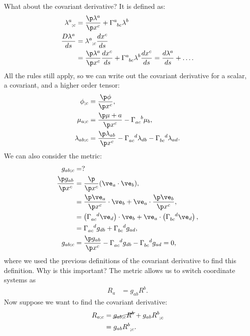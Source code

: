 \documentclass[a4paper, 11pt, normalem]{report}
\begin{document}
What about the covariant derivative?
It is defined as:
\begin{align}
    \tensor{\lambda}{^a_{;c}} &= \frac{\p\lambda^a}{\p x^c} + \tensor{\Gamma}{^a_{bc}}\lambda^b \\
    \frac{D\lambda^a}{ds} &= \tensor{\lambda}{^a_{;c}}\frac{dx^c}{ds} \\
                          &= \frac{\p\lambda^a}{\p x^c}\frac{dx^c}{ds} + \tensor{\Gamma}{^a_{bc}}\lambda^b\frac{dx^c}{ds} = \frac{d\lambda^a}{ds} + \dots.
\end{align}
All the rules still apply, so we can write out the covariant derivative for a scalar, a covariant, and a higher order tensor:
\begin{align}
    \phi_{;c} &= \frac{\p\phi}{\p x^c}, \\
    \mu_{a;c} &= \frac{\p\mu+a}{\p x^c}-\tensor{\Gamma}{_{ac}^b}\mu_b, \\
    \lambda_{ab;c} &= \frac{\p\lambda_{ab}}{\p x^c} - \tensor{\Gamma}{_{ac}^d}\lambda_{db}-\tensor{\Gamma}{_{bc}^d}\lambda_{ad}.
\end{align}
We can also consider the metric:
\begin{align}
    g_{ab;c} &= ? \\
    \frac{\p g_{ab}}{\p x^c} &= \frac{\p}{\p x^c} (\ve_a\cdot\ve_b), \\
                             &= \frac{\p\ve_a}{\p x^c}\cdot\ve_b + \ve_a\cdot\frac{\p\ve_b}{\p x^c},\\
                             &= \left(\tensor{\Gamma}{_{ac}^d}\ve_d\right)\cdot\ve_b + \ve_a\cdot\left(\tensor{\Gamma}{_{bc}^d}\ve_d\right), \\
                             &= \tensor{\Gamma}{_{ac}^d}g_{db} + \tensor{\Gamma}{_{bc}^d}g_{ad}, \\
    g_{ab;c} &= \frac{\p g_{ab}}{\p x^c} - \tensor{\Gamma}{_{ac}^d}g_{db} - \tensor{\Gamma}{_{bc}^d}g_{ad} = 0,
\end{align}
where we used the previous definitions of the covariant derivative to find this definition. 
Why is this important?
The metric allows us to switch coordinate systems as
\begin{align}
    R_a &= g_{ab}R^b.
\end{align}
Now suppose we want to find the covariant derivative:
\begin{align}
    R_{a;c} &= \cancel{g_{ab;c}R^b} + g_{ab}\tensor{R}{^b_{;c}} \\
            &= g_{ab}\tensor{R}{^b_{;c}}.
\end{align}
\end{document}
